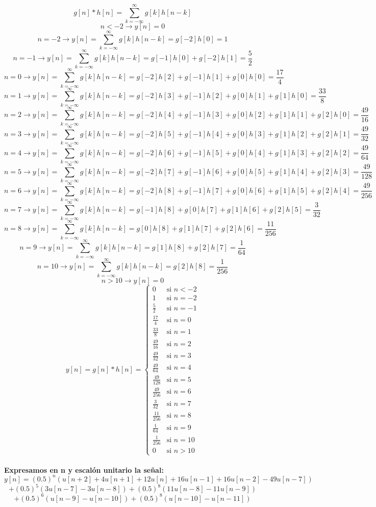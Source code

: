 \documentclass[11pt,a4paper]{article}
\begin{document}
{{\begin{enumerate}
$$g[n]*h[n]=\sum_{k=-\infty}^{\infty}g[k]h[n-k]$$
$$n<-2 \rightarrow y[n]=0 $$
$$n=-2 \rightarrow y[n]=\sum_{k=-\infty}^{\infty}g[k]h[n-k]=g[-2]h[0]=1 $$
$$n=-1 \rightarrow y[n]= \sum_{k=-\infty}^{\infty}g[k]h[n-k]=g[-1]h[0]+g[-2]h[1]=\frac{5}{2} $$
$$n=0 \rightarrow y[n]= \sum_{k=-\infty}^{\infty}g[k]h[n-k]=g[-2]h[2]+g[-1]h[1]+g[0]h[0]=\frac{17}{4} $$
$$n=1 \rightarrow y[n]= \sum_{k=-\infty}^{\infty}g[k]h[n-k]=g[-2]h[3]+g[-1]h[2]+g[0]h[1]+g[1]h[0]=\frac{33}{8} $$
$$n=2 \rightarrow y[n]= \sum_{k=-\infty}^{\infty}g[k]h[n-k]=g[-2]h[4]+g[-1]h[3]+g[0]h[2]+g[1]h[1]+g[2]h[0]=\frac{49}{16} $$
$$n=3 \rightarrow y[n]= \sum_{k=-\infty}^{\infty}g[k]h[n-k]=g[-2]h[5]+g[-1]h[4]+g[0]h[3]+g[1]h[2]+g[2]h[1] =\frac{49}{32}$$
$$n=4 \rightarrow y[n]= \sum_{k=-\infty}^{\infty}g[k]h[n-k]=g[-2]h[6]+g[-1]h[5]+g[0]h[4]+g[1]h[3]+g[2]h[2]=\frac{49}{64} $$
$$n=5 \rightarrow y[n]= \sum_{k=-\infty}^{\infty}g[k]h[n-k]=g[-2]h[7]+g[-1]h[6]+g[0]h[5]+g[1]h[4]+g[2]h[3]=\frac{49}{128} $$
$$n=6 \rightarrow y[n]= \sum_{k=-\infty}^{\infty}g[k]h[n-k]=g[-2]h[8]+g[-1]h[7]+g[0]h[6]+g[1]h[5]+g[2]h[4]=\frac{49}{256} $$
$$n=7 \rightarrow y[n]= \sum_{k=-\infty}^{\infty}g[k]h[n-k]=g[-1]h[8]+g[0]h[7]+g[1]h[6]+g[2]h[5]=\frac{3}{32} $$
$$n=8 \rightarrow y[n]= \sum_{k=-\infty}^{\infty}g[k]h[n-k]=g[0]h[8]+g[1]h[7]+g[2]h[6] =\frac{11}{256}$$
$$n=9 \rightarrow y[n]= \sum_{k=-\infty}^{\infty}g[k]h[n-k]=g[1]h[8]+g[2]h[7]=\frac{1}{64} $$
$$n=10 \rightarrow y[n]= \sum_{k=-\infty}^{\infty}g[k]h[n-k]=g[2]h[8]=\frac{1}{256}$$
$$n>10 \rightarrow y[n]=0 $$
\begin{equation*}
y[n]=g[n]*h[n] =
\begin{cases}
0 & \text{si $n<-2 $}\\
1 & \text{si $n= -2$}\\
\frac{5}{2} & \text{si $n= -1$}\\
\frac{17}{4} & \text{si $n= 0$}\\
\frac{33}{8} & \text{si $n= 1$}\\
\frac{49}{16} & \text{si $n= 2$}\\
\frac{49}{32} & \text{si $n= 3$}\\
\frac{49}{64} & \text{si $n=4$}\\
\frac{49}{128} & \text{si $n=5$}\\
\frac{49}{256} & \text{si $n=6$}\\
\frac{3}{32} & \text{si $n=7$}\\
\frac{11}{256} & \text{si $n=8$}\\
\frac{1}{64} & \text{si $n=9$}\\
\frac{1}{256} & \text{si $n=10$}\\
0 & \text{si $n>10$}
\end{cases}
\end{equation*}\\
\textbf{Expresamos en n y escalón unitario la señal:}
$$y[n]=(0.5)^n(u[n+2]+4u[n+1]+12u[n]+16u[n-1]+16u[n-2]-49u[n-7])$$ $$+(0.5)^5(3u[n-7]-3u[n-8])
+(0.5)^8(11u[n-8]-11u[n-9])$$ $$+(0.5)^6(u[n-9]-u[n-10])+(0.5)^8(u[n-10]-u[n-11])$$
	\end{enumerate}
	}}
\end{document}
